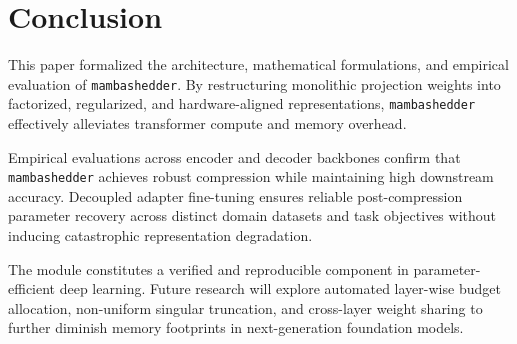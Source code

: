 \section{Conclusion}
This paper formalized the architecture, mathematical formulations, and empirical evaluation of \texttt{mambashedder}. By restructuring monolithic projection weights into factorized, regularized, and hardware-aligned representations, \texttt{mambashedder} effectively alleviates transformer compute and memory overhead.

Empirical evaluations across encoder and decoder backbones confirm that \texttt{mambashedder} achieves robust compression while maintaining high downstream accuracy. Decoupled adapter fine-tuning ensures reliable post-compression parameter recovery across distinct domain datasets and task objectives without inducing catastrophic representation degradation.

The module constitutes a verified and reproducible component in parameter-efficient deep learning. Future research will explore automated layer-wise budget allocation, non-uniform singular truncation, and cross-layer weight sharing to further diminish memory footprints in next-generation foundation models.
